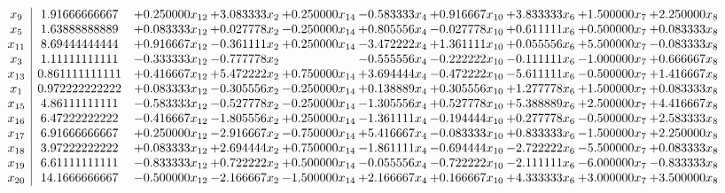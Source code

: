 \documentclass[10pt]{article}
\begin{document}
 \[\begin{array}{c| c c@{\hskip 2pt} c@{\hskip 2pt} c@{\hskip 2pt} c@{\hskip 2pt} c@{\hskip 2pt} c@{\hskip 2pt} c@{\hskip 2pt} c@{\hskip 2pt} }
 x_{9}   &  1.91666666667 & + 0.250000 x_{12} & + 3.083333 x_{2} & + 0.250000 x_{14} & -0.583333 x_{4} & + 0.916667 x_{10} & + 3.833333 x_{6} & + 1.500000 x_{7} & + 2.250000 x_{8}\\
 x_{5}   &  1.63888888889 & + 0.083333 x_{12} & + 0.027778 x_{2} & -0.250000 x_{14} & + 0.805556 x_{4} & -0.027778 x_{10} & + 0.611111 x_{6} & + 0.500000 x_{7} & + 0.083333 x_{8}\\
 x_{11}   &  8.69444444444 & + 0.916667 x_{12} & -0.361111 x_{2} & + 0.250000 x_{14} & -3.472222 x_{4} & + 1.361111 x_{10} & + 0.055556 x_{6} & + 5.500000 x_{7} & -0.083333 x_{8}\\
 x_{3}   &  1.11111111111 & -0.333333 x_{12} & -0.777778 x_{2} &   & -0.555556 x_{4} & -0.222222 x_{10} & -0.111111 x_{6} & -1.000000 x_{7} & + 0.666667 x_{8}\\
 x_{13}   &  0.861111111111 & + 0.416667 x_{12} & + 5.472222 x_{2} & + 0.750000 x_{14} & + 3.694444 x_{4} & -0.472222 x_{10} & -5.611111 x_{6} & -0.500000 x_{7} & + 1.416667 x_{8}\\
 x_{1}   &  0.972222222222 & + 0.083333 x_{12} & -0.305556 x_{2} & -0.250000 x_{14} & + 0.138889 x_{4} & + 0.305556 x_{10} & + 1.277778 x_{6} & + 1.500000 x_{7} & + 0.083333 x_{8}\\
 x_{15}   &  4.86111111111 & -0.583333 x_{12} & -0.527778 x_{2} & -0.250000 x_{14} & -1.305556 x_{4} & + 0.527778 x_{10} & + 5.388889 x_{6} & + 2.500000 x_{7} & + 4.416667 x_{8}\\
 x_{16}   &  6.47222222222 & -0.416667 x_{12} & -1.805556 x_{2} & + 0.250000 x_{14} & -1.361111 x_{4} & -0.194444 x_{10} & + 0.277778 x_{6} & -0.500000 x_{7} & + 2.583333 x_{8}\\
 x_{17}   &  6.91666666667 & + 0.250000 x_{12} & -2.916667 x_{2} & -0.750000 x_{14} & + 5.416667 x_{4} & -0.083333 x_{10} & + 0.833333 x_{6} & -1.500000 x_{7} & + 2.250000 x_{8}\\
 x_{18}   &  3.97222222222 & + 0.083333 x_{12} & + 2.694444 x_{2} & + 0.750000 x_{14} & -1.861111 x_{4} & -0.694444 x_{10} & -2.722222 x_{6} & -5.500000 x_{7} & + 0.083333 x_{8}\\
 x_{19}   &  6.61111111111 & -0.833333 x_{12} & + 0.722222 x_{2} & + 0.500000 x_{14} & -0.055556 x_{4} & -0.722222 x_{10} & -2.111111 x_{6} & -6.000000 x_{7} & -0.833333 x_{8}\\
 x_{20}   &  14.1666666667 & -0.500000 x_{12} & -2.166667 x_{2} & -1.500000 x_{14} & + 2.166667 x_{4} & + 0.166667 x_{10} & + 4.333333 x_{6} & + 3.000000 x_{7} & + 3.500000 x_{8}\\

\end{array}\]
\end{document}
